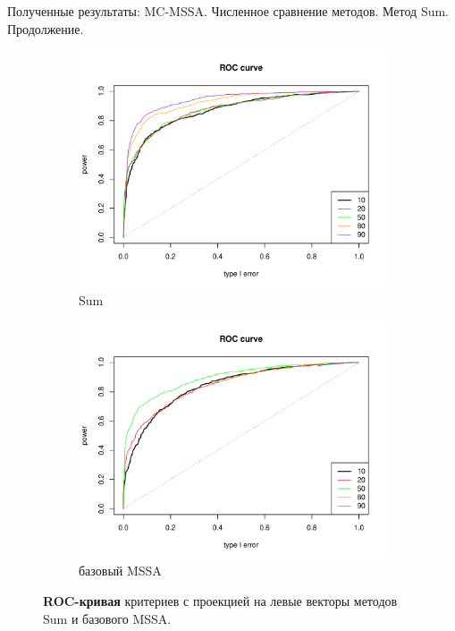 \documentclass[ucs, notheorems, handout]{beamer}
\begin{document}
\begin{frame}{Полученные результаты: MC-MSSA. Численное сравнение методов. Метод Sum. Продолжение.}
	\begin{figure}
		\captionsetup[subfigure]{justification=Centering}
		\begin{subfigure}[t]{0.45\textwidth}
			\centering
			\includegraphics[width=\textwidth]{roc_sum_ev.pdf}
			\caption{Sum}
		\end{subfigure}\hspace{\fill}
		\begin{subfigure}[t]{0.45\textwidth}
			\centering
			\includegraphics[width=\textwidth]{roc_mssa_ev.pdf}
			\caption{базовый MSSA}
		\end{subfigure}
		\caption{\textbf{ROC-кривая} критериев с проекцией на левые векторы методов Sum и базового MSSA.}
	\end{figure}
\end{frame}
\end{document}
